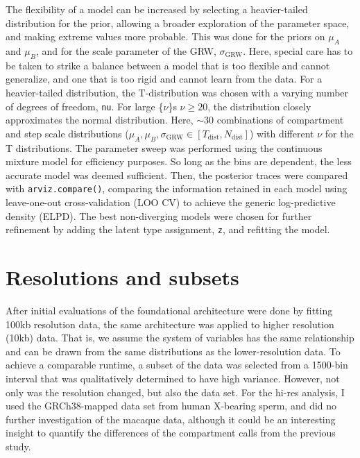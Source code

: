 \documentclass[
  10pt,
  a4paper,
  openany]{scrbook}
\begin{document}
The flexibility of a model can be increased by selecting a
heavier-tailed distribution for the prior, allowing a broader
exploration of the parameter space, and making extreme values more
probable. This was done for the priors on \(\mu_{A}\) and \(\mu_{B}\),
and for the scale parameter of the GRW, \(\sigma_{\mathrm{GRW}}\). Here,
special care has to be taken to strike a balance between a model that is
too flexible and cannot generalize, and one that is too rigid and cannot
learn from the data. For a heavier-tailed distribution, the
T-distribution was chosen with a varying number of degrees of freedom,
\texttt{nu}. For large \{\(\nu\)\}s \(\nu \geq 20\), the distribution
closely approximates the normal distribution. Here, \(\sim\!30\)
combinations of compartment and step scale distributions
(\(\mu_A,\mu_B, \sigma_{\mathrm{GRW}} \in [T_{\mathrm{dist}}, N_{\mathrm{dist}}]\))
with different \(\nu\) for the T distributions. The parameter sweep was
performed using the continuous mixture model for efficiency purposes. So
long as the bins are dependent, the less accurate model was deemed
sufficient. Then, the posterior traces were compared with
\texttt{arviz.compare()}, comparing the information retained in each
model using leave-one-out cross-validation (LOO CV) to achieve the
generic log-predictive density (ELPD). The best non-diverging models
were chosen for further refinement by adding the latent type assignment,
\texttt{z}, and refitting the model.

\section{Resolutions and subsets}\label{resolutions-and-subsets}

After initial evaluations of the foundational architecture were done by
fitting 100kb resolution data, the same architecture was applied to
higher resolution (10kb) data. That is, we assume the system of
variables has the same relationship and can be drawn from the same
distributions as the lower-resolution data. To achieve a comparable
runtime, a subset of the data was selected from a 1500-bin interval that
was qualitatively determined to have high variance. However, not only
was the resolution changed, but also the data set. For the hi-res
analysis, I used the GRCh38-mapped data set from human X-bearing sperm,
and did no further investigation of the macaque data, although it could
be an interesting insight to quantify the differences of the compartment
calls from the previous study.
\end{document}
